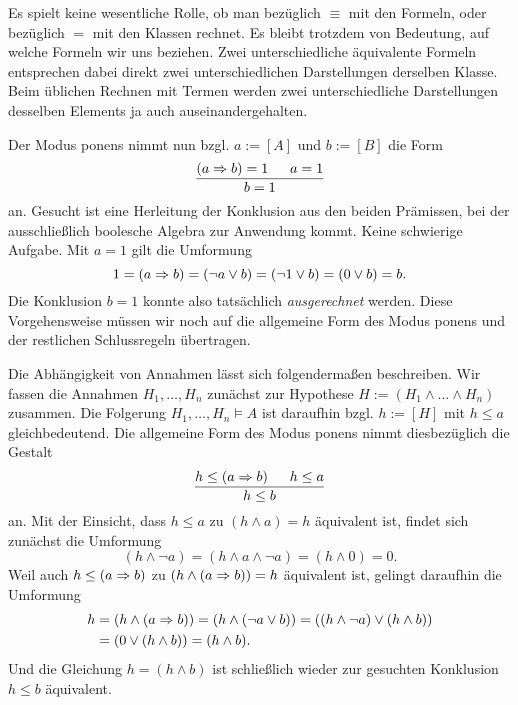 Es spielt keine wesentliche Rolle, ob man bezüglich $\equiv$ mit den
Formeln, oder bezüglich $=$ mit den Klassen rechnet. Es bleibt trotzdem
von Bedeutung, auf welche Formeln wir uns beziehen. Zwei unterschiedliche
äquivalente Formeln entsprechen dabei direkt zwei unterschiedlichen
Darstellungen derselben Klasse. Beim üblichen Rechnen mit Termen
werden zwei unterschiedliche Darstellungen desselben Elements ja auch
auseinandergehalten.

Der Modus ponens nimmt nun bzgl. $a:=[A]$ und $b:=[B]$ die Form%
\[\dfrac{(a\Rightarrow b)=1\quad\;\; a=1}{b=1}\]
an. Gesucht ist eine Herleitung der Konklusion aus den beiden Prämissen,
bei der ausschließlich boolesche Algebra zur Anwendung kommt. Keine
schwierige Aufgabe. Mit $a=1$ gilt die Umformung%
\[1 = (a\Rightarrow b) = (\lnot a\lor b) = (\lnot 1\lor b) = (0\lor b) = b.\]
Die Konklusion $b=1$ konnte also tatsächlich \emph{ausgerechnet} werden.
Diese Vorgehensweise müssen wir noch auf die allgemeine Form des Modus
ponens und der restlichen Schlussregeln übertragen.

Die Abhängigkeit von Annahmen lässt sich folgendermaßen beschreiben.
Wir fassen die Annahmen $H_1,\ldots,H_n$ zunächst zur Hypothese
$H:=(H_1\land\ldots\land H_n)$ zusammen. Die Folgerung
$H_1,\ldots,H_n\models A$ ist daraufhin bzgl. $h:=[H]$ mit $h\le a$
gleichbedeutend. Die allgemeine Form des Modus ponens nimmt
diesbezüglich die Gestalt
\[\dfrac{h\le (a\Rightarrow b)\quad\;\; h\le a}{h\le b}\]
an. Mit der Einsicht, dass $h\le a$ zu $(h\land a)=h$ äquivalent ist,
findet sich zunächst die Umformung%
\[(h\land\lnot a) = (h\land a\land\lnot a) = (h\land 0) = 0.\]
Weil auch $h\le (a\Rightarrow b)$ zu $(h\land (a\Rightarrow b))=h$ äquivalent ist,
gelingt daraufhin die Umformung%
\begin{align*}
h &= (h\land (a\Rightarrow b)) = (h\land (\lnot a\lor b))
= ((h\land\lnot a)\lor (h\land b))\\
&= (0\lor (h\land b)) = (h\land b).
\end{align*}
Und die Gleichung $h = (h\land b)$ ist schließlich wieder zur
gesuchten Konklusion $h\le b$ äquivalent.

